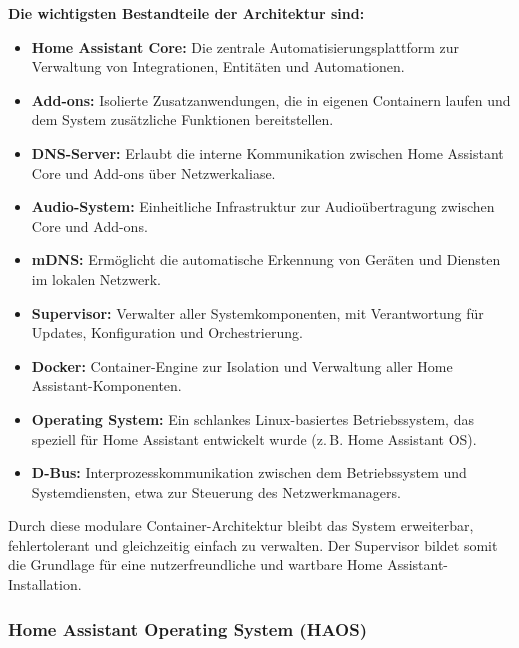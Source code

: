 \noindent
\textbf{Die wichtigsten Bestandteile der Architektur sind:}

\begin{itemize}
  \item \textbf{Home Assistant Core:} Die zentrale Automatisierungsplattform zur Verwaltung von Integrationen, Entitäten und Automationen.\\
  \item \textbf{Add-ons:} Isolierte Zusatzanwendungen, die in eigenen Containern laufen und dem System zusätzliche Funktionen bereitstellen.\\
  \item \textbf{DNS-Server:} Erlaubt die interne Kommunikation zwischen Home Assistant Core und Add-ons über Netzwerkaliase.\\
  \item \textbf{Audio-System:} Einheitliche Infrastruktur zur Audioübertragung zwischen Core und Add-ons.\\
  \item \textbf{mDNS:} Ermöglicht die automatische Erkennung von Geräten und Diensten im lokalen Netzwerk.\\
  \item \textbf{Supervisor:} Verwalter aller Systemkomponenten, mit Verantwortung für Updates, Konfiguration und Orchestrierung.\\
  \item \textbf{Docker:} Container-Engine zur Isolation und Verwaltung aller Home Assistant-Komponenten.\\
  \item \textbf{Operating System:} Ein schlankes Linux-basiertes Betriebssystem, das speziell für Home Assistant entwickelt wurde (z.\,B. Home Assistant OS).\\
  \item \textbf{D-Bus:} Interprozesskommunikation zwischen dem Betriebssystem und Systemdiensten, etwa zur Steuerung des Netzwerkmanagers.
\end{itemize}

\vspace{0.5em}
\noindent
Durch diese modulare Container-Architektur bleibt das System erweiterbar, fehlertolerant und gleichzeitig einfach zu verwalten. Der Supervisor bildet somit die Grundlage für eine nutzerfreundliche und wartbare Home Assistant-Installation.

\subsubsection{Home Assistant Operating System (HAOS)}


